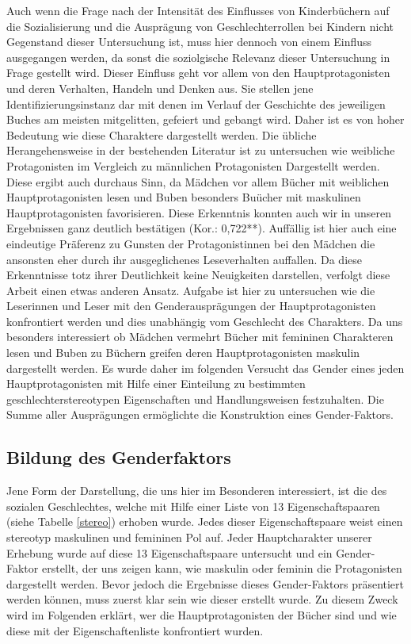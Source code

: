 Auch wenn die Frage nach der Intensität des Einflusses von Kinderbüchern
auf die Sozialisierung und die Ausprägung von Geschlechterrollen bei
Kindern nicht Gegenstand dieser Untersuchung ist, muss hier dennoch von
einem Einfluss ausgegangen werden, da sonst die soziolgische Relevanz
dieser Untersuchung in Frage gestellt wird. Dieser Einfluss geht vor
allem von den Hauptprotagonisten und deren Verhalten, Handeln und Denken
aus. Sie stellen jene Identifizierungsinstanz dar mit denen im Verlauf
der Geschichte des jeweiligen Buches am meisten mitgelitten, gefeiert
und gebangt wird. Daher ist es von hoher Bedeutung wie diese Charaktere
dargestellt werden. Die übliche Herangehensweise in der bestehenden
Literatur ist zu untersuchen wie weibliche Protagonisten im Vergleich zu
männlichen Protagonisten Dargestellt werden. Diese ergibt auch durchaus
Sinn, da Mädchen vor allem Bücher mit weiblichen Hauptprotagonisten
lesen und Buben besonders Buücher mit maskulinen Hauptprotagonisten
favorisieren. Diese Erkenntnis konnten auch wir in unseren Ergebnissen
ganz deutlich bestätigen (Kor.: 0,722**). Auffällig ist hier auch eine
eindeutige Präferenz zu Gunsten der Protagonistinnen bei den Mädchen die
ansonsten eher durch ihr ausgeglichenes Leseverhalten auffallen. Da
diese Erkenntnisse totz ihrer Deutlichkeit keine Neuigkeiten darstellen,
verfolgt diese Arbeit einen etwas anderen Ansatz. Aufgabe ist hier zu
untersuchen wie die Leserinnen und Leser mit den Genderausprägungen der
Hauptprotagonisten konfrontiert werden und dies unabhängig vom
Geschlecht des Charakters. Da uns besonders interessiert ob Mädchen
vermehrt Bücher mit femininen Charakteren lesen und Buben zu Büchern
greifen deren Hauptprotagonisten maskulin dargestellt werden. Es wurde
daher im folgenden Versucht das Gender eines jeden Hauptprotagonisten
mit Hilfe einer Einteilung zu bestimmten geschlechterstereotypen
Eigenschaften und Handlungsweisen festzuhalten. Die Summe aller
Ausprägungen ermöglichte die Konstruktion eines Gender-Faktors.

\subsection{Bildung des Genderfaktors}

Jene Form der Darstellung, die uns hier im Besonderen interessiert, ist
die des sozialen Geschlechtes, welche mit Hilfe einer Liste von 13
Eigenschaftspaaren (siehe Tabelle \ref{stereo}) erhoben wurde. Jedes
dieser Eigenschaftspaare weist einen stereotyp maskulinen und femininen
Pol auf. Jeder Hauptcharakter unserer Erhebung wurde auf diese 13
Eigenschaftspaare untersucht und ein Gender-Faktor erstellt, der uns
zeigen kann, wie maskulin oder feminin die Protagonisten dargestellt
werden. Bevor jedoch die Ergebnisse dieses Gender-Faktors präsentiert
werden können, muss zuerst klar sein wie dieser erstellt wurde. Zu
diesem Zweck wird im Folgenden erklärt, wer die Hauptprotagonisten der
Bücher sind und wie diese mit der Eigenschaftenliste konfrontiert
wurden.


